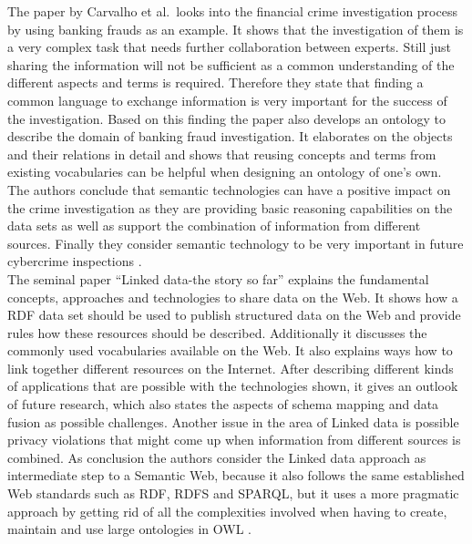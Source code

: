 The paper by Carvalho et al.\ looks into the financial crime investigation process by using banking frauds as an example. It shows that the investigation of them is a very complex task that needs further collaboration between experts. Still just sharing the information will not be sufficient as a common understanding of the different aspects and terms is required. Therefore they state that finding a common language to exchange information is very important for the success of the investigation. Based on this finding the paper also develops an ontology to describe the domain of banking fraud investigation. It elaborates on the objects and their relations in detail and shows that reusing concepts and terms from existing vocabularies can be helpful when designing an ontology of one's own. The authors conclude that semantic technologies can have a positive impact on the crime investigation as they are providing basic reasoning capabilities on the data sets as well as support the combination of information from different sources. Finally they consider semantic technology to be very important in future cybercrime inspections \citep{carvalhoapplying}. \\

The seminal paper ``Linked data-the story so far'' explains the fundamental concepts, approaches and technologies to share data on the Web. It shows how a \gls{RDF} data set should be used to publish structured data on the Web and provide rules how these resources should be described. Additionally it discusses the commonly used vocabularies available on the Web. It also explains ways how to link together different resources on the Internet. After describing different kinds of applications that are possible with the technologies shown, it gives an outlook of future research, which also states the aspects of schema mapping and data fusion as possible challenges. Another issue in the area of Linked data is possible privacy violations that might come up when information from different sources is combined. As conclusion the authors consider the Linked data approach as intermediate step to a Semantic Web, because it also follows the same established Web standards such as \gls{RDF}, \gls{RDFS} and \gls{SPARQL}, but it uses a more pragmatic approach by getting rid of all the complexities involved when having to create, maintain and use large ontologies in \gls{OWL} \citep{bizer2009linked}. \\

